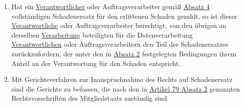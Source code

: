\begin{enumerate}
  \item Hat ein \hyperref[itm:04-7]{Verantwortlicher} oder Auftragsverarbeiter gemäß \hyperref[itm:82-4]{Absatz 4} vollständigen
   Schadenersatz für den erlittenen Schaden gezahlt, so ist dieser \hyperref[itm:04-7]{Verantwortliche} oder Auftragsverarbeiter berechtigt,
   von den übrigen an derselben \hyperref[itm:04-2]{Verarbeitung} beteiligten für die Datenverarbeitung \hyperref[itm:04-7]{Verantwortlichen} oder
   Auftragsverarbeitern den Teil des Schadenersatzes zurückzufordern, der unter den in \hyperref[itm:82-2]{Absatz 2}
   festgelegten Bedingungen ihrem Anteil an der Verantwortung für den Schaden entspricht.
  \label{itm:82-5}

  \item Mit Gerichtsverfahren zur Inanspruchnahme des Rechts auf Schadenersatz sind die Gerichte zu befassen, die nach
   den in \hyperref[itm:79-2]{Artikel 79 Absatz 2} genannten Rechtsvorschriften des Mitgliedstaats zuständig sind.
  \label{itm:82-6}

\end{enumerate}


